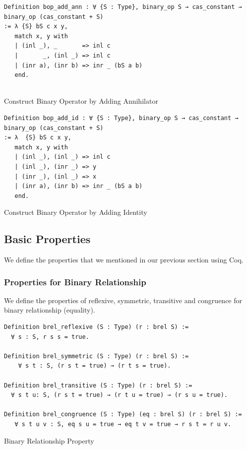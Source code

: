 \documentclass[a4paper,12pt,twoside,openright]{report}
\begin{document}
\begin{listing}[H]
\begin{verbatim}
Definition bop_add_ann : ∀ {S : Type}, binary_op S → cas_constant → binary_op (cas_constant + S)
:= λ {S} bS c x y, 
   match x, y with
   | (inl _), _       => inl c
   |       _, (inl _) => inl c
   | (inr a), (inr b) => inr _ (bS a b)
   end.
   
\end{verbatim}
\caption{Construct Binary Operator by Adding Annihilator} 
\label{coq:def:add_const_ann}
\end{listing}


\begin{listing}[H]
\begin{verbatim}
Definition bop_add_id : ∀ {S : Type}, binary_op S → cas_constant → binary_op (cas_constant + S)
:= λ  {S} bS c x y, 
   match x, y with
   | (inl _), (inl _) => inl c 
   | (inl _), (inr _) => y
   | (inr _), (inl _) => x
   | (inr a), (inr b) => inr _ (bS a b)
   end.
\end{verbatim}
\caption{Construct Binary Operator by Adding Identity} 
\label{coq:def:add_const_ann}
\end{listing}

\subsection{Basic Properties}

We define the properties that we mentioned in our previous section using Coq.

\subsubsection{Properties for Binary Relationship}
We define the properties of reflexive, symmetric, transitive and congruence for binary relationship (equality).

\begin{listing}[H]
\begin{verbatim}
Definition brel_reflexive (S : Type) (r : brel S) :=
  ∀ s : S, r s s = true.

Definition brel_symmetric (S : Type) (r : brel S) := 
    ∀ s t : S, (r s t = true) → (r t s = true). 

Definition brel_transitive (S : Type) (r : brel S) := 
  ∀ s t u: S, (r s t = true) → (r t u = true) → (r s u = true).

Definition brel_congruence (S : Type) (eq : brel S) (r : brel S) := 
   ∀ s t u v : S, eq s u = true → eq t v = true → r s t = r u v.
\end{verbatim}
\caption{Binary Relationship Property} 
\label{coq:def:brel_properties}
\end{listing}
\end{document}
